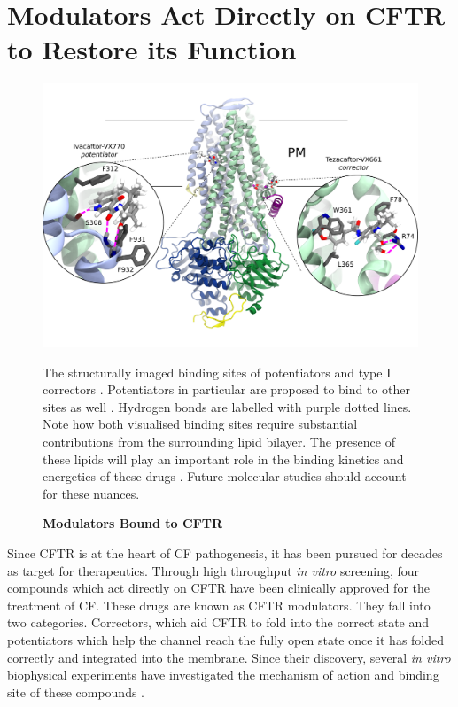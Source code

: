 \section{Modulators Act Directly on CFTR to Restore its Function}
\begin{figure}
	\label{drugs_bound}
	\begin{center}
		\includegraphics[width=1\textwidth]{figures/drugs_bound_overall.pdf}
	\end{center}
	\captionsetup{singlelinecheck = false, justification=raggedright}
	\caption[Modulators Bound to CFTR] {\textbf{Modulators Bound to CFTR}}{The structurally imaged binding sites of potentiators and type I correctors \cite{liu2019, fiedorczuk2022}. Potentiators in particular are proposed to bind to other sites as well \cite{yeh2019, liu2019}. Hydrogen bonds are labelled with purple dotted lines. Note how both visualised binding sites require substantial contributions from the surrounding lipid bilayer. The presence of these lipids will play an important role in the binding kinetics and energetics of these drugs \cite{csanady2019}. Future molecular studies should account for these nuances.} 
\end{figure}

Since CFTR is at the heart of CF pathogenesis, it has been pursued for decades as target for therapeutics. Through high throughput \textit{in vitro} screening, four compounds which act directly on CFTR have been clinically approved for the treatment of CF. These drugs are known as CFTR modulators. They fall into two categories. Correctors, which aid CFTR to fold into the correct state and potentiators which help the channel reach the fully open state once it has folded correctly and integrated into the membrane. Since their discovery, several \textit {in vitro} biophysical experiments have investigated the mechanism of action and binding site of these compounds \cite{csanady2019,  laselva2022, yeh2017, yeh2019, fiedorczuk2022, krainer2018}. 

